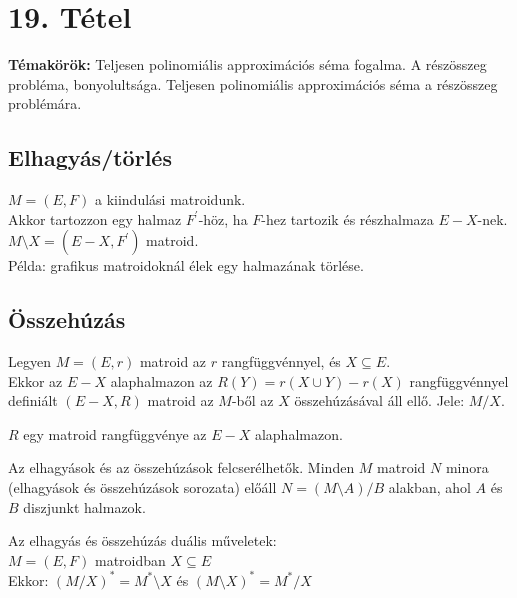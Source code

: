 
\setcounter{chapter}{19}
\chapter*{19. Tétel}

\textbf{Témakörök:} Teljesen polinomiális approximációs séma fogalma. A részösszeg probléma, bonyolultsága. Teljesen polinomiális approximációs séma a részösszeg problémára.

\noindent\hrulefill

\section*{Elhagyás/törlés}
$M=(E,F)$ a kiindulási matroidunk.\\
Akkor tartozzon egy halmaz $F^{'}$-höz, ha $F$-hez tartozik és részhalmaza $E-X$-nek.\\
$M\setminus X=(E-X,F^{'})$ matroid.\\
Példa: grafikus matroidoknál élek egy halmazának törlése.

\section*{Összehúzás}
Legyen $M=(E,r)$ matroid az $r$ rangfüggvénnyel, és $X\subseteq E$.\\
Ekkor az $E-X$ alaphalmazon az $R(Y)=r(X\cup Y)-r(X)$ rangfüggvénnyel definiált $(E-X,R)$ matroid az $M$-ből az $X$ összehúzásával áll ellő. Jele: $M/X$.

\begin{lem}
$R$ egy matroid rangfüggvénye az $E-X$ alaphalmazon.
\end{lem}

\begin{theo}
Az elhagyások és az összehúzások felcserélhetők. Minden $M$ matroid $N$ minora (elhagyások és összehúzások sorozata) előáll $N=(M\setminus A)/B$ alakban, ahol $A$ és $B$ diszjunkt halmazok.
\end{theo}

\begin{theo}
Az elhagyás és összehúzás duális műveletek:\\
$M=(E,F)$ matroidban $X\subseteq E$\\
Ekkor: $(M/X)^{*}=M^{*}\setminus X$ és $(M\setminus X)^{*}=M^{*}/X$
\end{theo}

